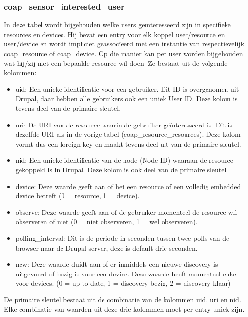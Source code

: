 \subsubsection{coap\_sensor\_interested\_user}
In deze tabel wordt bijgehouden welke users ge\"{i}nteresseerd zijn in specifieke resources en devices. Hij bevat een entry voor elk koppel user/resource en user/device en wordt impliciet geassoc\"{i}eerd met een instantie van respectievelijk coap\_resource of coap\_device. Op die manier kan per user worden bijgehouden wat hij/zij met een bepaalde resource wil doen. Ze bestaat uit de volgende kolommen:
\begin{itemize}
\item uid: Een unieke identificatie voor een gebruiker. Dit ID is overgenomen uit Drupal, daar hebben alle gebruikers ook een uniek User ID. Deze kolom is tevens deel van de primaire sleutel.
\item uri: De URI van de resource waarin de gebruiker ge\"{i}nteresseerd is. Dit is dezelfde URI als in de vorige tabel (coap\_resource\_resources). Deze kolom vormt dus een foreign key en maakt tevens deel uit van de primaire sleutel.
\item nid: Een unieke identificatie van de node (Node ID) waaraan de resource gekoppeld is in Drupal. Deze kolom is ook deel van de primaire sleutel.
\item device: Deze waarde geeft aan of het een resource of een volledig embedded device betreft (0 = resource, 1 = device).
\item observe: Deze waarde geeft aan of de gebruiker momenteel de resource wil observeren of niet (0 = niet observeren, 1 = wel observeren).
\item polling\_interval: Dit is de periode in seconden tussen twee polls van de browser naar de Drupal-server, deze is default drie seconden.
\item new: Deze waarde duidt aan of er inmiddels een nieuwe discovery is uitgevoerd of bezig is voor een device. Deze waarde heeft momenteel enkel voor devices. (0 = up-to-date, 1 = discovery bezig, 2 = discovery klaar)
\end{itemize}
De primaire sleutel bestaat uit de combinatie van de kolommen uid, uri en nid. Elke combinatie van waarden uit deze drie kolommen moet per entry uniek zijn.

